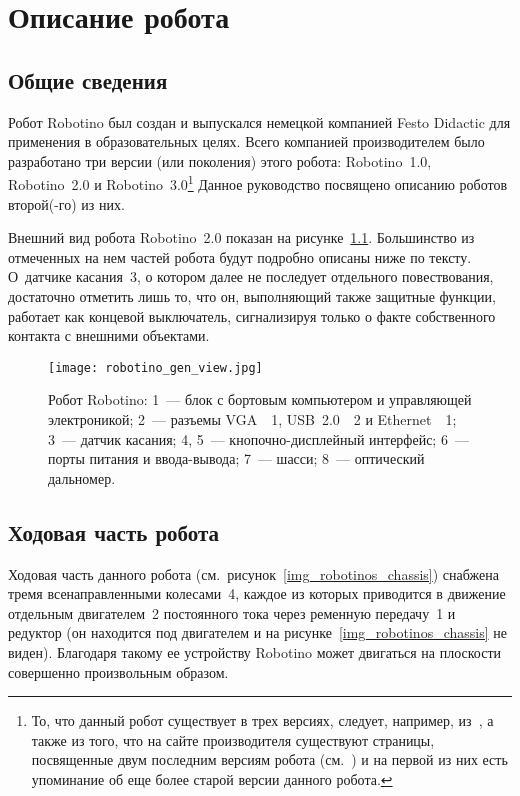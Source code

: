 \chapter{Описание робота}
\section{Общие сведения}
Робот Robotino был создан и выпускался немецкой компанией Festo Didactic для применения в образовательных целях.
Всего компанией производителем было разработано три версии (или поколения) этого робота: Robotino~1.0, Robotino~2.0 и Robotino~3.0\footnote{То, что данный робот существует в трех версиях, следует, например, из~\cite{history_hard_page}, а также из того, что на сайте производителя существуют страницы, посвященные двум последним версиям робота (см.~\cite{festo_page_with_robotino_until_2013, festo_page_with_robotino_3}) и на первой из них есть упоминание об еще более старой версии данного робота.}
Данное руководство посвящено описанию роботов второй(-го) из них.

Внешний вид робота Robotino~2.0 показан на рисунке~\ref{img_gen_view_of_robotino}.
Большинство из отмеченных на нем частей робота будут подробно описаны ниже по тексту.
О~датчике касания~3, о котором далее не последует отдельного повествования, достаточно отметить лишь то, что он, выполняющий также защитные функции, работает как концевой выключатель, сигнализируя только о факте собственного контакта с внешними объектами.

\begin{figure}[h]
	\centering
	\texttt{[image: robotino\_gen\_view.jpg]}
	\caption{Робот Robotino: 1~--- блок с бортовым компьютером и управляющей электроникой; 2~--- разъемы VGA~\texttimes{}~1, USB~2.0~\texttimes{}~2 и Ethernet~\texttimes{}~1; 3~--- датчик касания; 4, 5~--- кнопочно-дисплейный интерфейс; 6~--- порты питания и ввода-вывода; 7~--- шасси; 8~--- оптический дальномер.}
	\label{img_gen_view_of_robotino}
\end{figure}



\section{Ходовая часть робота}
Ходовая часть данного робота (см.~рисунок~\ref{img_robotinos_chassis}) снабжена тремя всенаправленными колесами~4, каждое из которых приводится в движение отдельным двигателем~2 постоянного тока через ременную передачу~1 и редуктор (он находится под двигателем и на рисунке~\ref{img_robotinos_chassis} не виден).
Благодаря такому ее устройству Robotino может двигаться на плоскости совершенно произвольным образом.

